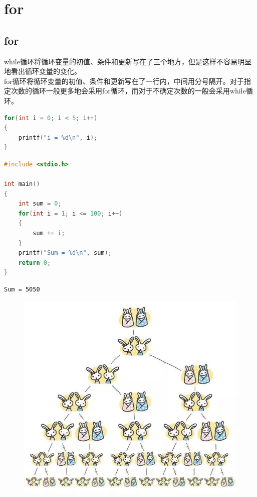 \section{for}

\subsection{for}

while循环将循环变量的初值、条件和更新写在了三个地方，但是这样不容易明显地看出循环变量的变化。\\

for循环将循环变量的初值、条件和更新写在了一行内，中间用分号隔开。对于指定次数的循环一般更多地会采用for循环，而对于不确定次数的一般会采用while循环。

\begin{lstlisting}[language=C]
for(int i = 0; i < 5; i++)
{
    printf("i = %d\n", i);
}
\end{lstlisting}

\vspace{0.5cm}


\begin{lstlisting}[language=C]
#include <stdio.h>

int main()
{
    int sum = 0;
    for(int i = 1; i <= 100; i++)
    {
        sum += i;
    }
    printf("Sum = %d\n", sum);
    return 0;
}
\end{lstlisting}

\begin{tcolorbox}
    \begin{verbatim}
Sum = 5050
\end{verbatim}
\end{tcolorbox}

\vspace{0.5cm}


\begin{figure}[H]
    \centering
    \includegraphics[scale=0.5]{img/C4/4-4/1.png}
\end{figure}

